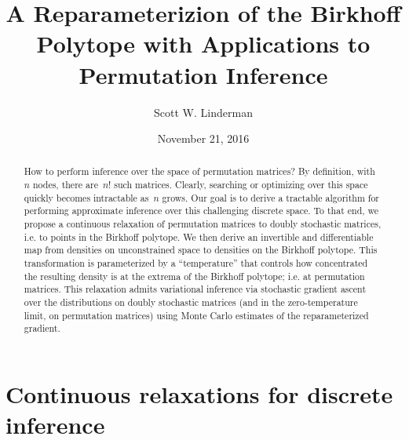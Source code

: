 



\title{A Reparameterizion of the Birkhoff Polytope
with Applications to Permutation Inference}
\author{Scott W. Linderman}
\date{November 21, 2016}


\maketitle

\begin{abstract}
How to perform inference over the space of permutation matrices?  By
definition, with~$n$ nodes, there are~$n!$ such matrices.  Clearly,
searching or optimizing over this space quickly becomes intractable
as~$n$ grows. Our goal is to derive a tractable algorithm for
performing approximate inference over this challenging discrete space.
To that end, we
propose a continuous relaxation of permutation matrices to doubly
stochastic matrices, i.e. to points in the Birkhoff polytope.  We then
derive an invertible and differentiable map from densities on
unconstrained space to densities on the Birkhoff polytope. This
transformation is parameterized by a ``temperature'' that controls how
concentrated the resulting density is at the extrema of the Birkhoff
polytope; i.e. at permutation matrices.  This relaxation admits
variational inference via stochastic gradient ascent over the
distributions on doubly stochastic matrices (and in the zero-temperature
limit, on permutation matrices) using Monte Carlo estimates of the
reparameterized gradient.
\end{abstract}

\section{Continuous relaxations for discrete inference}

